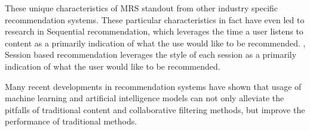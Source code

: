 These unique characteristics of MRS standout from other industry specific recommendation systems. These particular characteristics in fact have even led to research in Sequential recommendation, which leverages the time a user listens to content as a primarily indication of what the use would like to be recommended. \cite{Fang2020}, Session based recommendation leverages the style of each session as a primarily indication of what the user would like to be recommended. \cite{Rijke_2019} 

Many recent developments in recommendation systems have shown that usage  of machine learning and artificial intelligence  models can not only alleviate the pitfalls of traditional content and collaborative filtering methods, but improve the performance of traditional methods.

